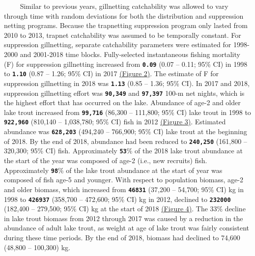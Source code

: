 \documentclass[
]{article}
\begin{document}
~~~~ Similar to previous years, gillnetting catchability was allowed to
vary through time with random deviations for both the distribution and
suppression netting programs. Because the trapnetting suppression
program only lasted from 2010 to 2013, trapnet catchability was assumed
to be temporally constant. For suppression gillnetting, separate
catchability parameters were estimated for 1998-2000 and 2001-2018 time
blocks. Fully-selected instantaneous fishing mortality (F) for
suppression gillnetting increased from \textbf{\texttt{0.09}} (0.07 --
0.11; 95\% CI) in 1998 to \textbf{\texttt{1.10}} (0.87 -- 1.26; 95\% CI)
in 2017 \protect\hyperlink{fig2}{(Figure 2)}. The estimate of F for
suppression gillnetting in 2018 was \textbf{\texttt{1.13}} (0.85 --
1.36; 95\% CI). In 2017 and 2018, suppression gillnetting effort was
\textbf{\texttt{90,349}} and \textbf{\texttt{97,397}} 100-m net nights,
which is the highest effort that has occurred on the lake. Abundance of
age-2 and older lake trout increased from \textbf{\texttt{99,716}}
(86,300 -- 111,800; 95\% CI) lake trout in 1998 to
\textbf{\texttt{922,960}} (810,140 -- 1,038,780; 95\% CI) fish in 2012
\protect\hyperlink{fig3}{(Figure 3)}. Estimated abundance was
\textbf{\texttt{628,203}} (494,240 -- 766,900; 95\% CI) lake trout at
the beginning of 2018. By the end of 2018, abundance had been reduced to
\textbf{\texttt{240,250}} (161,800 -- 320,300; 95\% CI) fish.
Approximately \textbf{\texttt{53}}\% of the 2018 lake trout abundance at
the start of the year was composed of age-2 (i.e., new recruits) fish.
Approximately \textbf{\texttt{98}}\% of the lake trout abundance at the
start of year was composed of fish age-5 and younger. With respect to
population biomass, age-2 and older biomass, which increased from
\textbf{\texttt{46831}} (37,200 -- 54,700; 95\% CI) kg in 1998 to
\textbf{\texttt{426937}} (358,700 -- 472,600; 95\% CI) kg in 2012,
declined to \textbf{\texttt{232000}} (182,400 -- 279,500; 95\% CI) kg at
the start of 2018 \protect\hyperlink{fig4}{(Figure 4)}. The 33\% decline
in lake trout biomass from 2012 through 2017 was caused by a reduction
in the abundance of adult lake trout, as weight at age of lake trout was
fairly consistent during these time periods. By the end of 2018, biomass
had declined to 74,600 (48,800 -- 100,300) kg.
\end{document}
